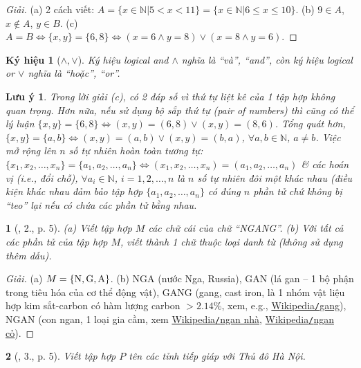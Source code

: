 \documentclass{article}
\newtheorem{baitoan}{}
\newtheorem{kyhieu}{Ký hiệu}
\newtheorem{luuy}{Lưu ý}
\begin{document}
\begin{proof}[Giải]
	(a) 2 cách viết: $A = \{x\in\mathbb{N}|5 < x < 11\} = \{x\in\mathbb{N}|6\le x\le10\}$. (b) $9\in A$, $x\notin A$, $y\in B$. (c) $A = B\Leftrightarrow\{x,y\} = \{6,8\}\Leftrightarrow(x = 6\land y = 8)\lor(x = 8\land y = 6)$.
\end{proof}

\begin{kyhieu}[$\land,\lor$]
	Ký hiệu logical and $\land$ nghĩa là ``và'', ``and'', còn ký hiệu logical or $\lor$ nghĩa là ``hoặc'', ``or''.
\end{kyhieu}

\begin{luuy}
	Trong lời giải (c), có 2 đáp số vì thứ tự liệt kê của 1 tập hợp không quan trọng. Hơn nữa, nếu sử dụng bộ sắp thứ tự (pair of numbers) thì cũng có thể lý luận $\{x,y\} = \{6,8\}\Leftrightarrow(x,y) = (6,8)\lor(x,y) = (8,6)$. Tổng quát hơn, $\{x,y\} = \{a,b\}\Leftrightarrow(x,y) = (a,b)\lor(x,y) = (b,a)$, $\forall a,b\in\mathbb{N}$, $a\ne b$. Việc mở rộng lên $n$ số tự nhiên hoàn toàn tương tự: $\{x_1,x_2,\ldots,x_n\} = \{a_1,a_2,\ldots,a_n\}\Leftrightarrow(x_1,x_2,\ldots,x_n) = (a_1,a_2,\ldots,a_n)$ \& các hoán vị (i.e., đổi chỗ), $\forall a_i\in\mathbb{N}$, $i = 1,2,\ldots,n$ là $n$ số tự nhiên đôi một khác nhau (điều kiện khác nhau đảm bảo tập hợp $\{a_1,a_2,\ldots,a_n\}$ có đúng $n$ phần tử chứ không bị ``teo'' lại nếu có chứa các phần tử bằng nhau.
\end{luuy}

\begin{baitoan}[\cite{Tuyen_Toan_6}, 2., p. 5]
	(a) Viết tập hợp $M$ các chữ cái của chữ {\rm``NGANG''}. (b) Với tất cả các phần tử của tập hợp $M$, viết thành 1 chữ thuộc loại danh từ (không sử dụng thêm dấu).
\end{baitoan}

\begin{proof}[Giải]
	(a) $M = \{{\rm N,G,A}\}$. (b) NGA (nước Nga, Russia), GAN (lá gan -- 1 bộ phận trong tiêu hóa của cơ thể động vật), GANG (gang, cast iron, là 1 nhóm vật liệu hợp kim sắt-carbon có hàm lượng carbon $> 2.14\%$, xem, e.g., \href{https://vi.wikipedia.org/wiki/Gang}{Wikipedia{\tt/}gang}), NGAN (con ngan, 1 loại gia cầm, xem \href{https://vi.wikipedia.org/wiki/Ngan_nh%C3%A0}{Wikipedia{\tt/}ngan nhà}, \href{https://vi.wikipedia.org/wiki/Ngan_c%E1%BB%8F}{Wikipedia{\tt/}ngan cỏ}).
\end{proof}

\begin{baitoan}[\cite{Tuyen_Toan_6}, 3., p. 5]
	Viết tập hợp $P$ tên các tỉnh tiếp giáp với Thủ đô Hà Nội.
\end{baitoan}
\end{document}
